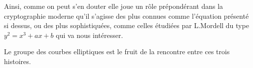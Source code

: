 Ainsi, comme on peut s'en douter elle joue un rôle prépondérant dans la
cryptographie moderne qu'il s'agisse des plus connues comme l'équation présenté si dessus, ou
des plus sophistiquées, comme celles étudiées par L.Mordell du type $y^2 = x^3 + ax+b$ qui va
nous intéresser.

Le groupe des courbes elliptiques est le fruit de la rencontre entre ces trois
histoires.













